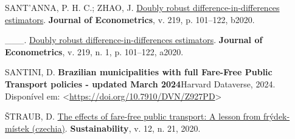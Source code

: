 \documentclass[12pt, a4paper, twoside]{article}
\numberwithin{equation}{subsection} %
\newlength{\cslhangindent}
\newlength{\cslentryspacingunit} %
\newenvironment{CSLReferences}[2] %
 {%
  \setlength{\parindent}{0pt}
  \ifodd #1
  \let\oldpar\par
  \def\par{\hangindent=\cslhangindent\oldpar}
  \fi
  \setlength{\parskip}{#2\cslentryspacingunit}
 }%
 {}
\begin{document}
\begin{CSLReferences}{0}{0}
\leavevmode{}%
SANT'ANNA, P. H. C.; ZHAO, J.
\href{https://doi.org/10.1016/j.jeconom.2020.06.003}{Doubly robust
difference-in-differences estimators}. \textbf{Journal of Econometrics},
v. 219, p. 101--122, b2020.

\leavevmode{}%
\_\_\_. \href{https://doi.org/10.1016/j.jeconom.2020.06.003}{Doubly
robust difference-in-differences estimators}. \textbf{Journal of
Econometrics}, v. 219, n. 1, p. 101--122, a2020.

\leavevmode{}%
SANTINI, D. \textbf{{Brazilian municipalities with full Fare-Free Public
Transport policies - updated March 2024}}Harvard Dataverse, 2024.
Disponível em:
\textless{}\url{https://doi.org/10.7910/DVN/Z927PD}\textgreater{}

\leavevmode{}%
ŠTRAUB, D. \href{https://doi.org/10.3390/su12219111}{The effects of
fare-free public transport: A lesson from frýdek-místek (czechia)}.
\textbf{Sustainability}, v. 12, n. 21, 2020.

\end{CSLReferences}




\appendix





\end{document}
